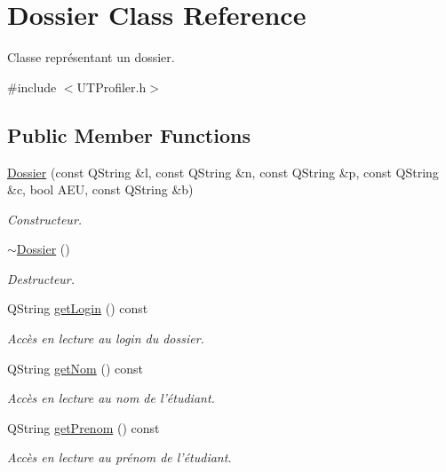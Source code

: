 \hypertarget{class_dossier}{\section{Dossier Class Reference}
\label{class_dossier}
}


Classe représentant un dossier.  




{\ttfamily \#include $<$U\-T\-Profiler.\-h$>$}

\subsection*{Public Member Functions}
\begin{DoxyCompactItemize}
\item 
\hyperlink{class_dossier_a1515244d31ad29cf612ed2c57087e5b4}{Dossier} (const Q\-String \&l, const Q\-String \&n, const Q\-String \&p, const Q\-String \&c, bool A\-E\-U, const Q\-String \&b)
\begin{DoxyCompactList}\small\item\em Constructeur. \end{DoxyCompactList}\item 
\hyperlink{class_dossier_a4bf1904d4f2dfe7ddbcf38171fc661c0}{$\sim$\-Dossier} ()
\begin{DoxyCompactList}\small\item\em Destructeur. \end{DoxyCompactList}\item 
Q\-String \hyperlink{class_dossier_ae6e2044f4bb8202a5a9adce367c5e599}{get\-Login} () const 
\begin{DoxyCompactList}\small\item\em Accès en lecture au login du dossier. \end{DoxyCompactList}\item 
Q\-String \hyperlink{class_dossier_a30808ae53f1600719be62fab9365b032}{get\-Nom} () const 
\begin{DoxyCompactList}\small\item\em Accès en lecture au nom de l'étudiant. \end{DoxyCompactList}\item 
Q\-String \hyperlink{class_dossier_a7991a5fe62363f3a72cdbc7b4b8e7aa5}{get\-Prenom} () const 
\begin{DoxyCompactList}\small\item\em Accès en lecture au prénom de l'étudiant. \end{DoxyCompactList}\item 

\end{DoxyCompactItemize}
